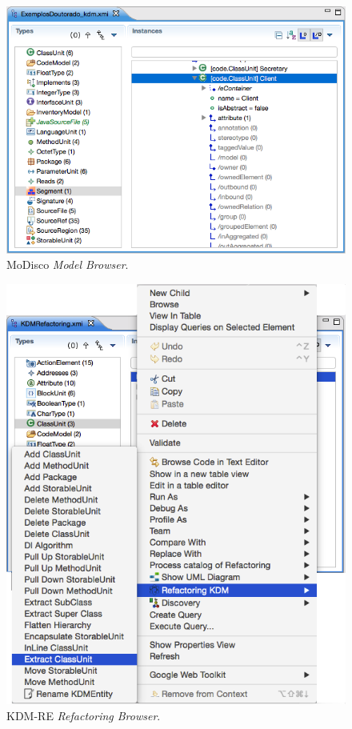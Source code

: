 \begin{figure}[h]
	\centering
	\caption{MoDisco \textit{Model Browser}.}
	\label{fig:modisco_modeol_browser}
	\includegraphics[scale=0.6]{images/kdm-re_modisco}
	\fautor
\end{figure}

\begin{figure}[h]
	\centering
	\caption{KDM-RE \textit{Refactoring Browser}.}
	\label{fig:kdm_re_refactoring_arvore}
	\includegraphics[scale=0.55]{images/novoMenuPopupKDM_RE}
	\fautor
\end{figure}


